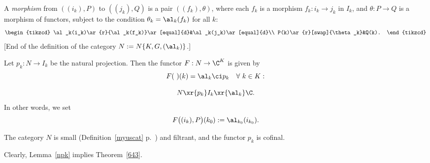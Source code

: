 \documentclass[12pt]{article}
\theoremstyle{remark}
\theoremstyle{definition}
\begin{document}
A \emph{morphism} from $((i_k),P)$ to $((j_k),Q)$ is a pair $((f_k),\theta)$, where each $f_k$ is a morphism $f_k:i_k\to j_k$ in $I_k$, and $\theta:P\to Q$ is a morphism of functors, subject to the condition $\theta_k=\al_k(f_k)$ for all $k$: 
$$ 
\begin{tikzcd} 
\al_k(i_k)\ar{r}{\al_k(f_k)}\ar[equal]{d}&\al_k(j_k)\ar[equal]{d}\\ 
P(k)\ar{r}[swap]{\theta_k}&Q(k).
\end{tikzcd} 
$$ 
[End of the definition of the category $N:=N\{K,G,(\al_k)\}$.] 

Let $p_k:N\to I_k$ be the natural projection. Then the functor %
$F:N\to\C^K$ is given by 
$$
F(\ )(k)=\al_k\ci p_k\quad\forall\ k\in K:
$$ 

$$
N\xr{p_k}I_k\xr{\al_k}\C.
$$ 
In other words, we set
$$
F\big((i_k),P\big)(k_0):=\al_{k_0}(i_{k_0}).
$$ 

\begin{lem}
The category $N$ is small (Definition~\ref{myuscat} p.~) and filtrant, and the functor $p_k$ is cofinal.
\end{lem} 

Clearly, Lemma~\ref{npk} implies Theorem~\ref{643}.  
\end{document}
